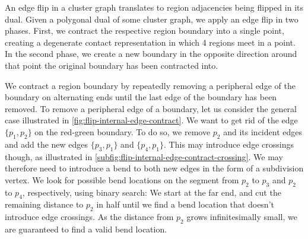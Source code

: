 An edge flip in a cluster graph translates to region adjacencies being flipped in its dual. Given a polygonal dual of some cluster graph, we apply an edge flip in two phases. First, we contract the respective region boundary into a single point, creating a degenerate contact representation in which 4 regions meet in a point. In the second phase, we create a new boundary in the opposite direction around that point the original boundary has been contracted into.


We contract a region boundary by repeatedly removing a peripheral edge of the boundary on alternating ends until the last edge of the boundary has been removed. To remove a peripheral edge of a boundary, let us consider the general case illustrated in \cref{fig:flip-internal-edge-contract}. We want to get rid of the edge $\{p_1,p_2\}$ on the red-green boundary. To do so, we  remove $p_2$ and its incident edges and add the new edges $\{p_3,p_1\}$ and $\{p_4,p_1\}$. This may introduce edge crossings though, as illustrated in \cref{subfig:flip-internal-edge-contract-crossing}. We may therefore need to introduce a bend to both new edges in the form of a subdivision vertex. We look for possible bend locations on the segment from $p_2$ to $p_3$ and $p_2$ to $p_4$, respectively, using binary search: We start at the far end, and cut the remaining distance to $p_2$ in half until we find a bend location that doesn't introduce edge crossings. As the distance from $p_2$ grows infinitesimally small, we are guaranteed to find a valid bend location.

